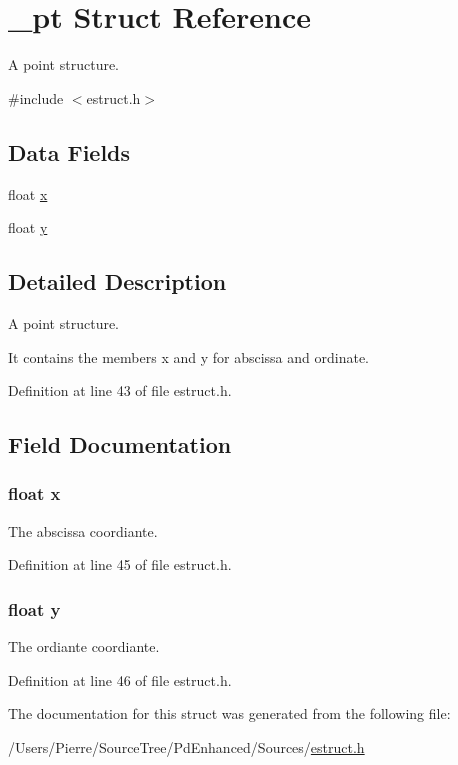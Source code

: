 \hypertarget{struct__pt}{\section{\-\_\-pt Struct Reference}
\label{struct__pt}
}


A point structure.  




{\ttfamily \#include $<$estruct.\-h$>$}

\subsection*{Data Fields}
\begin{DoxyCompactItemize}
\item 
float \hyperlink{struct__pt_ad0da36b2558901e21e7a30f6c227a45e}{x}
\item 
float \hyperlink{struct__pt_aa4f0d3eebc3c443f9be81bf48561a217}{y}
\end{DoxyCompactItemize}


\subsection{Detailed Description}
A point structure. 

It contains the members x and y for abscissa and ordinate. 

Definition at line 43 of file estruct.\-h.



\subsection{Field Documentation}
\hypertarget{struct__pt_ad0da36b2558901e21e7a30f6c227a45e}{
\subsubsection[{x}]{\setlength{\rightskip}{0pt plus 5cm}float x}}\label{struct__pt_ad0da36b2558901e21e7a30f6c227a45e}
The abscissa coordiante. 

Definition at line 45 of file estruct.\-h.

\hypertarget{struct__pt_aa4f0d3eebc3c443f9be81bf48561a217}{
\subsubsection[{y}]{\setlength{\rightskip}{0pt plus 5cm}float y}}\label{struct__pt_aa4f0d3eebc3c443f9be81bf48561a217}
The ordiante coordiante. 

Definition at line 46 of file estruct.\-h.



The documentation for this struct was generated from the following file\-:\begin{DoxyCompactItemize}
\item 
/\-Users/\-Pierre/\-Source\-Tree/\-Pd\-Enhanced/\-Sources/\hyperlink{estruct_8h}{estruct.\-h}\end{DoxyCompactItemize}
